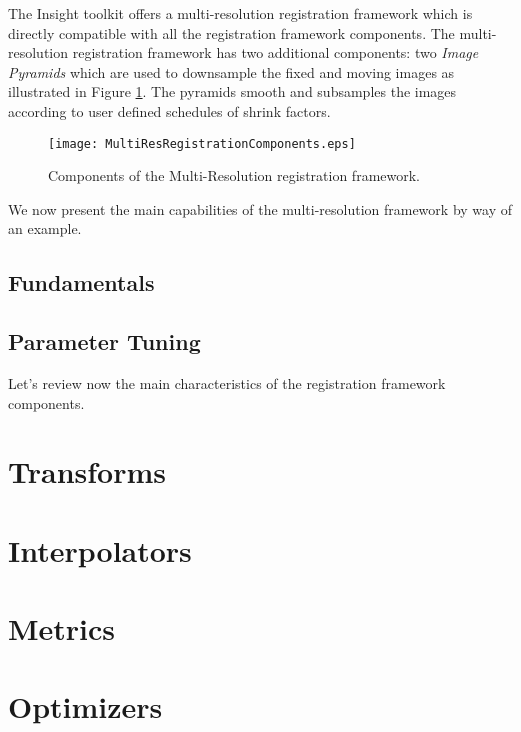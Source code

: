 The Insight toolkit offers a multi-resolution registration framework which
is directly compatible with all the registration framework components. The
multi-resolution registration framework has two additional components:
two \emph{Image Pyramids} which are used to downsample the fixed and moving
images as illustrated in Figure \ref{fig:MultiResRegistrationComponents}.
The pyramids smooth and subsamples the images according to user defined
schedules of shrink factors. 
 
\begin{figure}
\center
\texttt{[image: MultiResRegistrationComponents.eps]}
\caption{Components of the Multi-Resolution registration framework.}
\label{fig:MultiResRegistrationComponents}
\end{figure}
 
We now present the main capabilities of the multi-resolution framework by
way of an example.

\subsection{Fundamentals}


\subsection{Parameter Tuning}


Let's review now the main characteristics of the registration framework components. 

\section{Transforms}
\label{sec:Transforms}


\section{Interpolators}
\label{sec:Interpolators}


\section{Metrics}
\label{sec:Metrics}


\section{Optimizers}
\label{sec:Optimizers}


